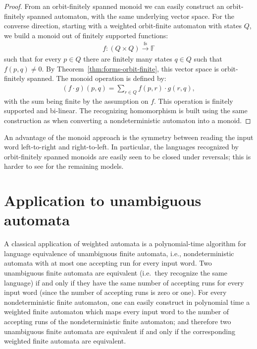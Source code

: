 \documentclass[10pt,a4paper]{amsart}
\numberwithin{equation}{section}
\newcommand{\field}{\mathbb F}
\newcommand{\finsup}{\stackrel{\mathrm{fs}}{\to}}
\newcommand{\forms}[1]{#1 \finsup \field}
\begin{document}
\begin{proof}
    From an orbit-finitely spanned monoid we can easily construct an orbit-finitely spanned automaton, with the same underlying vector space. For the converse direction, starting with a weighted orbit-finite automaton with states $Q$, we build a monoid out of finitely supported functions:
    \begin{align*}
    f  : \forms {(Q \times Q)}
    \end{align*}
    such that for every $p \in Q$ there are finitely many states $q \in Q$ such that $f(p,q) \neq 0$. By Theorem~\ref{thm:forms-orbit-finite}, this vector space is orbit-finitely spanned. The monoid operation is defined by:
    \begin{align*}
    (f \cdot g) (p,q) = \sum_{r \in Q} f(p,r)\cdot g(r,q),
    \end{align*}
    with the sum being finite by the assumption on $f$. This operation is finitely supported and bi-linear. The recognizing homomorphism is built using the same construction as when converting a nondeterministic automaton into a monoid.
\end{proof}

An advantage of the monoid approach is the symmetry between reading the input word left-to-right and right-to-left. In particular, the languages recognized by orbit-finitely spanned monoids are easily seen to be closed under reversals; this is harder to see  for the remaining models. 


\section{Application to  unambiguous automata}
\label{sec:unamb}
A classical application of weighted automata is a polynomial-time algorithm for language equivalence of unambiguous finite automata, i.e., nondeterministic automata with at most one accepting run for every input word.
Two unambiguous finite automata are equivalent (i.e.~they recognize the same language)  if and only if they have the same number of accepting runs for every input word (since the number of accepting runs is zero or one).
For every nondeterministic finite automaton, one can easily construct in polynomial time a weighted finite automaton which maps every input word to the number of accepting runs of the nondeterministic finite automaton; and therefore two unambiguous finite automata are equivalent if and only if the  corresponding weighted finite automata are equivalent.
\end{document}
